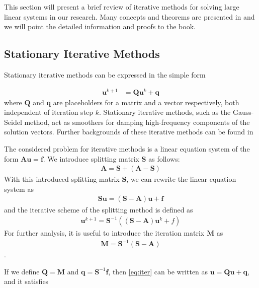 This section will present a brief review of iterative methods for solving large linear systems in our research. Many concepts and theorems are presented in \citep{doi:10.1137/1.9780898718003} and we will point the detailed information and proofs to the book.
\subsection{Stationary Iterative Methods}
\label{sec:iterative-methods}
Stationary iterative methods can be expressed in the simple form

\begin{align}
    \boldsymbol{u}^{k+1} &= \boldsymbol{Q} \boldsymbol{u}^k + \boldsymbol{q}
    \label{iter:stationary}
\end{align}
where $\boldsymbol{Q}$ and $\boldsymbol{q}$ are placeholders for a matrix and a vector respectively, both independent of iteration step $k$. Stationary iterative methods, such as the Gauss-Seidel method, act as smoothers for damping high-frequency components of the solution vectors. Further backgrounds of these iterative methods can be found in \citep{doi:10.1137/1.9780898718003}

The considered problem for iterative methods is a linear equation system of the form $\boldsymbol{A} \boldsymbol{u} = \boldsymbol{f}$. We introduce splitting matrix $\boldsymbol{S}$ as follows:
\begin{align}
    \boldsymbol{A} = \boldsymbol{S} + (\boldsymbol{A} - \boldsymbol{S})
\end{align}
With this introduced splitting matrix $\boldsymbol{S}$, we can rewrite the linear equation system as
\begin{align}
    \boldsymbol{S}\boldsymbol{u} = (\boldsymbol{S} - \boldsymbol{A}) \boldsymbol{u} + \boldsymbol{f}
\end{align}
and the iterative scheme of the splitting method is defined as 
\begin{align}
    \boldsymbol{u}^{k+1} = \boldsymbol{S}^{-1}((\boldsymbol{S} - \boldsymbol{A}) \boldsymbol{u}^k + f)
    \label{eq:iter}
\end{align}
For further analysis, it is useful to introduce the iteration matrix $\boldsymbol{M}$ as
\begin{align}
    \boldsymbol{M} = \boldsymbol{S}^{-1}(\boldsymbol{S} - \boldsymbol{A})
\end{align}.

If we define $\boldsymbol{Q} = \boldsymbol{M}$ and $\boldsymbol{q} = \boldsymbol{S}^{-1}\boldsymbol{f}$, then \autoref{eq:iter} can be written as $\boldsymbol{u} = \boldsymbol{Q}\boldsymbol{u} + \boldsymbol{q}$, and it satisfies

